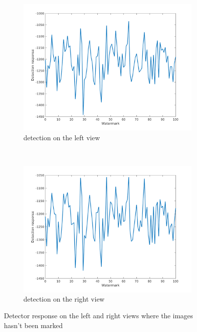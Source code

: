 \begin{figure}[h!]
    \centering
    \begin{subfigure}[t]{0.5\textwidth}
        \centering
\includegraphics[width=1\textwidth]{./img/likelihood/correct_LikelihoodL_NM.png}
          \caption{\small{detection on the left view}}
\label{fig:Llnm}

    \end{subfigure}%
    ~ 
    \begin{subfigure}[t]{0.5\textwidth}
        \centering
\includegraphics[width=1\textwidth]{./img/likelihood/correct_LikelihoodLr_NM.png}
           \caption{\small{detection on the right view}}
\label{fig:Lrnm}
    \end{subfigure}
    \caption{Detector response on the left and right views where the images hasn't been marked}
    \label{fig:Lnm}
\end{figure}


